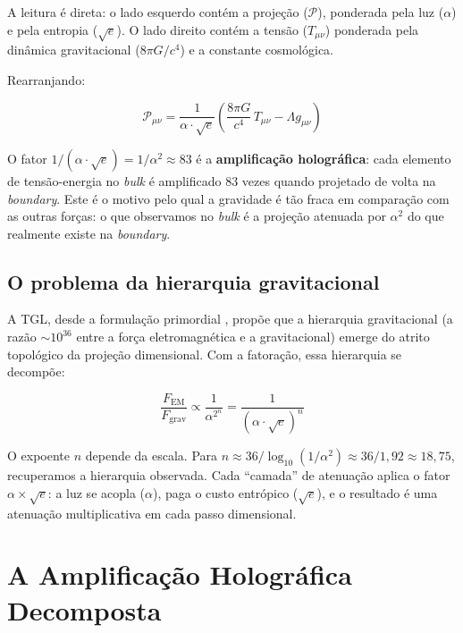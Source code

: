 \documentclass[12pt,a4paper,twoside]{article}
\newcommand{\alphaii}{\alpha^{2}}
\newcommand{\boundary}{\textit{boundary}}
\newcommand{\bulk}{\textit{bulk}}
\begin{document}
A leitura é direta: o lado esquerdo contém a projeção ($\mathcal{P}$), ponderada pela luz ($\alpha$) e pela entropia ($\sqrt{e}$). O lado direito contém a tensão ($T_{\mu\nu}$) ponderada pela dinâmica gravitacional ($8\pi G/c^4$) e a constante cosmológica.

Rearranjando:

\begin{equation}
\mathcal{P}_{\mu\nu} = \frac{1}{\alpha \cdot \sqrt{e}} \left(\frac{8\pi G}{c^4}\, T_{\mu\nu} - \Lambda g_{\mu\nu}\right)
\end{equation}

O fator $1/(\alpha \cdot \sqrt{e}) = 1/\alphaii \approx 83$ é a \textbf{amplificação holográfica}: cada elemento de tensão-energia no \bulk{} é amplificado 83 vezes quando projetado de volta na \boundary. Este é o motivo pelo qual a gravidade é tão fraca em comparação com as outras forças: o que observamos no \bulk{} é a projeção atenuada por $\alphaii$ do que realmente existe na \boundary.

\subsection{O problema da hierarquia gravitacional}

A TGL, desde a formulação primordial \cite{Miguel2026Fronteira}, propõe que a hierarquia gravitacional (a razão $\sim 10^{36}$ entre a força eletromagnética e a gravitacional) emerge do atrito topológico da projeção dimensional. Com a fatoração, essa hierarquia se decompõe:

\begin{equation}
\frac{F_{\text{EM}}}{F_{\text{grav}}} \propto \frac{1}{\alphaii^n} = \frac{1}{(\alpha \cdot \sqrt{e})^n}
\end{equation}

O expoente $n$ depende da escala. Para $n \approx 36/\log_{10}(1/\alphaii) \approx 36/1{,}92 \approx 18{,}75$, recuperamos a hierarquia observada. Cada ``camada'' de atenuação aplica o fator $\alpha \times \sqrt{e}$: a luz se acopla ($\alpha$), paga o custo entrópico ($\sqrt{e}$), e o resultado é uma atenuação multiplicativa em cada passo dimensional.



\section{A Amplificação Holográfica Decomposta}
\label{sec:amplificacao}
\end{document}
